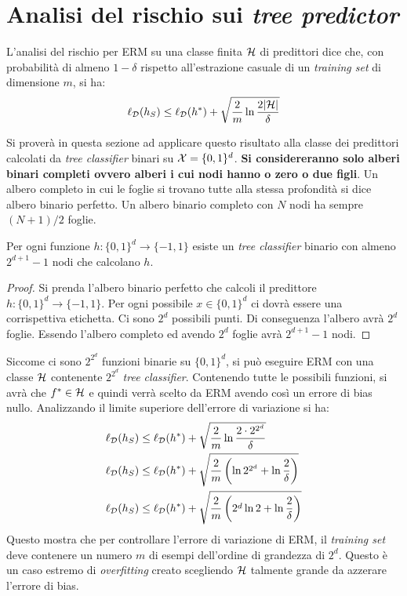 \section{Analisi del rischio sui \textit{tree predictor}}

L'analisi del rischio per ERM su una classe finita $\mathcal{H}$ di predittori dice che,
con probabilità di almeno $1-\delta$ rispetto all'estrazione casuale di un
\textit{training set} di dimensione $m$, si ha:
$$ \ell_{\mathcal{D}}(h_S) \leq \ell_{\mathcal{D}}(h^*)
+\sqrt{\frac{2}{m}\ln{\frac{2|\ensuremath{\mathcal{H}}|}{\delta}}} $$

Si proverà in questa sezione ad applicare questo risultato alla classe dei
predittori calcolati da \textit{tree classifier} binari su $\mathcal{X}=\{0,1\}^d$.
\textbf{Si considereranno solo alberi binari completi ovvero alberi i cui nodi
hanno o zero o due figli}. Un albero completo in cui le foglie si trovano tutte
alla stessa profondità si dice albero binario perfetto. Un albero binario completo
con $N$ nodi ha sempre $(N+1)/2$ foglie.

\begin{observation}
Per ogni funzione $h:\{0,1\}^d \rightarrow \{-1,1\}$ esiste un
\textit{tree classifier} binario con almeno $2^{d+1}-1$ nodi che calcolano $h$.
\end{observation}
\begin{proof}
    Si prenda l'albero binario perfetto che calcoli il predittore
    $h:\{0,1\}^d \rightarrow \{-1,1\}$. Per ogni possibile $x\in\{0,1\}^d$ ci dovrà
    essere una corrispettiva etichetta. Ci sono $2^d$ possibili punti. Di conseguenza
    l'albero avrà $2^d$ foglie. Essendo l'albero completo ed avendo $2^d$ foglie
    avrà $2^{d+1}-1$ nodi.
\end{proof}

Siccome ci sono $2^{2^d}$ funzioni binarie su $\{0,1\}^d$, si può eseguire ERM con
una classe $\mathcal{H}$ contenente $2^{2^d}$ \textit{tree classifier}. Contenendo tutte
le possibili funzioni, si avrà che $f^*\in\mathcal{H}$ e quindi verrà scelto da ERM 
avendo così un errore di bias nullo. Analizzando il limite superiore dell'errore di
variazione si ha:
\begin{align}
    \ell_{\mathcal{D}}(h_S) &\leq \ell_{\mathcal{D}}(h^*)
        +\sqrt{\frac{2}{m}\ln{\frac{2\cdot2^{2^d}}{\delta}}}\notag\\
    \ell_{\mathcal{D}}(h_S) &\leq \ell_{\mathcal{D}}(h^*)
        +\sqrt{\frac{2}{m}\left(\ln{2^{2^d}}+\ln{\frac{2}{\delta}}\right)}\notag\\
    \ell_{\mathcal{D}}(h_S) &\leq \ell_{\mathcal{D}}(h^*)
        +\sqrt{\frac{2}{m}\left(2^d\ln{2}+\ln{\frac{2}{\delta}}\right)}\notag
\end{align}
Questo mostra che per controllare l'errore di variazione di ERM, il \textit{training
set} deve contenere un numero $m$ di esempi dell'ordine di grandezza di $2^d$. Questo
è un caso estremo di \textit{overfitting} creato scegliendo $\mathcal{H}$ talmente grande
da azzerare l'errore di bias.

